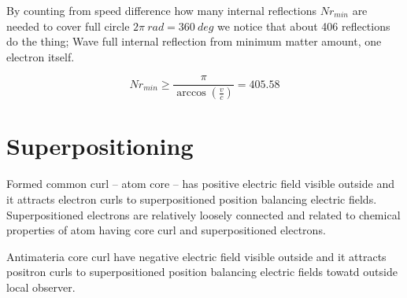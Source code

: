 




By counting from speed difference how many internal reflections $Nr_{min}$
are needed to cover full circle $2\pi~rad = 360~deg$ we notice that about
406 reflections do the thing; Wave full internal reflection from minimum
matter amount, one electron itself.

\begin{equation} \label{eq:minimum_number_of_reflections}
	Nr_{min}\geq
	\frac {\pi}{\arccos(\frac{v}{c})}
	= 405.58
\end{equation}

\section{Superpositioning}
\label{superpositioning}

Formed common curl -- atom core -- has positive electric field visible outside
and it attracts electron curls to superpositioned position balancing electric
fields. Superpositioned electrons are relatively loosely connected and related
to chemical properties of atom having core curl and superpositioned electrons.

Antimateria core curl have negative electric field visible outside and it
attracts positron curls to superpositioned position balancing electric fields
towatd outside local observer.

